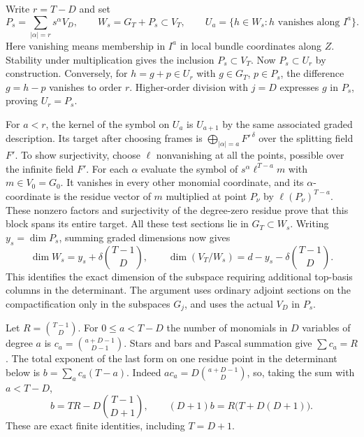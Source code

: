 Write \(r=T-D\) and set
\[
 P_s=\sum_{|\alpha|=r}s^\alpha V_D,\qquad W_s=G_T+P_s\subset V_T,
 \qquad U_a=\{h\in W_s:h\text{ vanishes along }I^a\}.
\]
Here vanishing means membership in \(I^a\) in local bundle
coordinates along \(Z\). Stability under multiplication gives the
inclusion \(P_s\subset V_T\). Now \(P_s\subset U_r\) by construction.
Conversely, for \(h=g+p\in U_r\) with \(g\in G_T\), \(p\in P_s\),
the difference \(g=h-p\) vanishes to order \(r\). Higher-order
division with \(j=D\) expresses \(g\) in \(P_s\), proving \(U_r=P_s\).

For \(a<r\), the kernel of the symbol on \(U_a\) is \(U_{a+1}\)
by the same associated graded description. Its target after choosing
frames is \(\bigoplus_{|\alpha|=a} F'^{\,\delta}\) over the splitting
field \(F'\). To show surjectivity, choose \(\ell\) nonvanishing at
all the points, possible over the infinite field \(F'\).
For each \(\alpha\) evaluate the symbol of
\(s^\alpha\ell^{T-a}m\) with \(m\in V_0=G_0\). It vanishes in
every other monomial coordinate, and its \(\alpha\)-coordinate is the
residue vector of \(m\) multiplied at point \(P_\nu\) by
\(\ell(P_\nu)^{T-a}\). These nonzero factors and surjectivity of the
degree-zero residue prove that this block spans its entire target.
All these test sections lie in \(G_T\subset W_s\).
Writing \(y_s=\dim P_s\), summing graded dimensions now gives
\[
            \dim W_s=y_s+\delta\binom{T-1}{D},\qquad
            \dim(V_T/W_s)=d-y_s-\delta\binom{T-1}{D}.
\]
This identifies the exact dimension of the subspace requiring
additional top-basis columns in the determinant. The argument uses
ordinary adjoint sections on the compactification only in the
subspaces \(G_j\), and uses the actual \(V_D\) in \(P_s\).

Let \(R=\binom{T-1}{D}\). For \(0\le a<T-D\) the number of
monomials in \(D\) variables of degree \(a\) is
\(c_a=\binom{a+D-1}{D-1}\). Stars and bars and Pascal summation give
\(\sum c_a=R\). The total exponent of the last form on one residue
point in the determinant below is \(b=\sum_a c_a(T-a)\). Indeed
\(a c_a=D\binom{a+D-1}{D}\), so, taking the sum with \(a<T-D\),
\[
 b=TR-D\binom{T-1}{D+1},\qquad
 (D+1)b=R\bigl(T+D(D+1)\bigr).
\]
These are exact finite identities, including \(T=D+1\).

